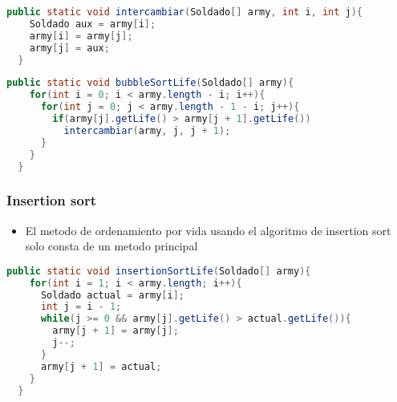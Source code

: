       \begin{lstlisting}[language=java, caption={Metodo auxiliar}]
  public static void intercambiar(Soldado[] army, int i, int j){
    Soldado aux = army[i];
    army[i] = army[j];
    army[j] = aux;
  }
\end{lstlisting}
      \begin{lstlisting}[language=java, caption={Metodo bubble sort}]
  public static void bubbleSortLife(Soldado[] army){
    for(int i = 0; i < army.length - i; i++){
      for(int j = 0; j < army.length - 1 - i; j++){
        if(army[j].getLife() > army[j + 1].getLife())
          intercambiar(army, j, j + 1);
      }
    }
  }
\end{lstlisting}

\subsubsection{Insertion sort}
\begin{itemize}
    \item El metodo de ordenamiento por vida usando el algoritmo de insertion sort solo consta de un metodo principal
\end{itemize}
      \begin{lstlisting}[language=java, caption={Metodo bubble sort}]
  public static void insertionSortLife(Soldado[] army){
    for(int i = 1; i < army.length; i++){
      Soldado actual = army[i];
      int j = i - 1;
      while(j >= 0 && army[j].getLife() > actual.getLife()){
        army[j + 1] = army[j];
        j--;
      }
      army[j + 1] = actual;
    }
  }
\end{lstlisting}


